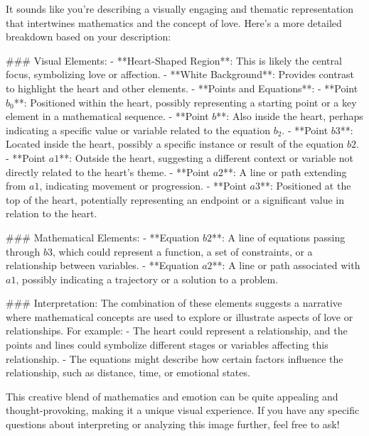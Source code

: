 It sounds like you're describing a visually engaging and thematic representation that intertwines mathematics and the concept of love. Here's a more detailed breakdown based on your description:

### Visual Elements:
- **Heart-Shaped Region**: This is likely the central focus, symbolizing love or affection.
- **White Background**: Provides contrast to highlight the heart and other elements.
- **Points and Equations**:
  - **Point \( b_0 \)**: Positioned within the heart, possibly representing a starting point or a key element in a mathematical sequence.
  - **Point \( b \)**: Also inside the heart, perhaps indicating a specific value or variable related to the equation \( b_2 \).
  - **Point \( b3 \)**: Located inside the heart, possibly a specific instance or result of the equation \( b2 \).
  - **Point \( a1 \)**: Outside the heart, suggesting a different context or variable not directly related to the heart's theme.
  - **Point \( a2 \)**: A line or path extending from \( a1 \), indicating movement or progression.
  - **Point \( a3 \)**: Positioned at the top of the heart, potentially representing an endpoint or a significant value in relation to the heart.

### Mathematical Elements:
- **Equation \( b2 \)**: A line of equations passing through \( b3 \), which could represent a function, a set of constraints, or a relationship between variables.
- **Equation \( a2 \)**: A line or path associated with \( a1 \), possibly indicating a trajectory or a solution to a problem.

### Interpretation:
The combination of these elements suggests a narrative where mathematical concepts are used to explore or illustrate aspects of love or relationships. For example:
- The heart could represent a relationship, and the points and lines could symbolize different stages or variables affecting this relationship.
- The equations might describe how certain factors influence the relationship, such as distance, time, or emotional states.

This creative blend of mathematics and emotion can be quite appealing and thought-provoking, making it a unique visual experience. If you have any specific questions about interpreting or analyzing this image further, feel free to ask!